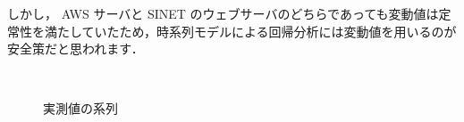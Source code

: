 \documentclass[a4j]{jarticle}
\begin{document}
しかし， AWS サーバと SINET のウェブサーバのどちらであっても変動値は定常性を満たしていたため，時系列モデルによる回帰分析には変動値を用いるのが安全策だと思われます．
\begin{figure}[tb]
\centering
{}~
\\
\caption{実測値の系列}
\end{figure}
\end{document}
